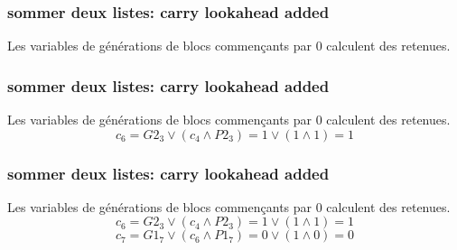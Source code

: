 \documentclass[10pt,xcolor={usenames,dvipsnames}]{beamer}
\begin{document}

\begin{frame} 
\frametitle{sommer deux listes: carry lookahead added}
  \begin{figure}
    \begin{center}
      \begin{tikzpicture}[scale = 0.7, transform shape]
      	
      \end{tikzpicture}
    \end{center}
  \end{figure}
Les variables de générations de blocs commençants par 0 calculent des retenues.
\[\quad \]
\[\quad \]
\end{frame} 


\begin{frame} 
\frametitle{sommer deux listes: carry lookahead added}
  \begin{figure}
    \begin{center}
      \begin{tikzpicture}[scale = 0.7, transform shape]
      	
      \end{tikzpicture}
    \end{center}
  \end{figure}
Les variables de générations de blocs commençants par 0 calculent des retenues.
\[c_6 = G2_3 \vee \left( c_4 \wedge P2_3\right) = 1 \vee \left( 1 \wedge 1 \right) = 1 \]
\[\quad\]
\end{frame} 


\begin{frame} 
\frametitle{sommer deux listes: carry lookahead added}
  \begin{figure}
    \begin{center}
      \begin{tikzpicture}[scale = 0.7, transform shape]
      	
      \end{tikzpicture}
    \end{center}
  \end{figure}
Les variables de générations de blocs commençants par 0 calculent des retenues.
\[c_6 = G2_3 \vee \left( c_4 \wedge P2_3\right) = 1 \vee \left( 1 \wedge 1 \right) = 1 \]
\[c_7 = G1_7 \vee \left( c_6 \wedge P1_7\right) = 0 \vee \left( 1 \wedge 0 \right) = 0 \]
\end{frame} 
\end{document}
